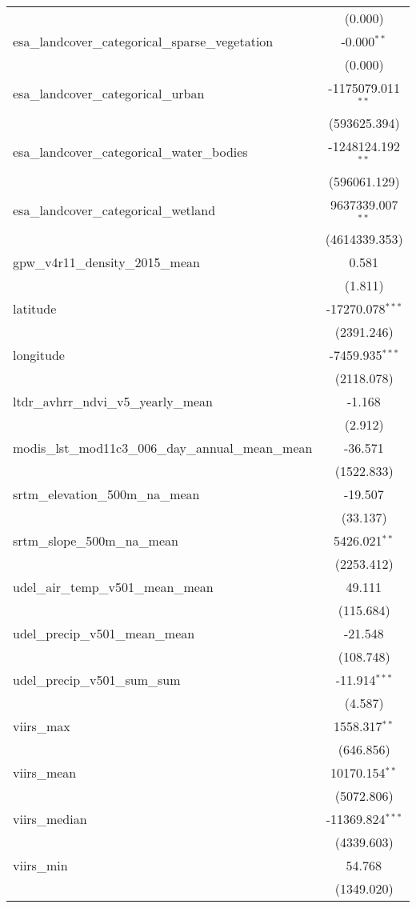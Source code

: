 \begin{table}[!htbp]
\begin{tabular}{@{\extracolsep{5pt}}lc}
  & (0.000) \\
 esa_landcover_categorical_sparse_vegetation & -0.000$^{**}$ \\
  & (0.000) \\
 esa_landcover_categorical_urban & -1175079.011$^{**}$ \\
  & (593625.394) \\
 esa_landcover_categorical_water_bodies & -1248124.192$^{**}$ \\
  & (596061.129) \\
 esa_landcover_categorical_wetland & 9637339.007$^{**}$ \\
  & (4614339.353) \\
 gpw_v4r11_density_2015_mean & 0.581$^{}$ \\
  & (1.811) \\
 latitude & -17270.078$^{***}$ \\
  & (2391.246) \\
 longitude & -7459.935$^{***}$ \\
  & (2118.078) \\
 ltdr_avhrr_ndvi_v5_yearly_mean & -1.168$^{}$ \\
  & (2.912) \\
 modis_lst_mod11c3_006_day_annual_mean_mean & -36.571$^{}$ \\
  & (1522.833) \\
 srtm_elevation_500m_na_mean & -19.507$^{}$ \\
  & (33.137) \\
 srtm_slope_500m_na_mean & 5426.021$^{**}$ \\
  & (2253.412) \\
 udel_air_temp_v501_mean_mean & 49.111$^{}$ \\
  & (115.684) \\
 udel_precip_v501_mean_mean & -21.548$^{}$ \\
  & (108.748) \\
 udel_precip_v501_sum_sum & -11.914$^{***}$ \\
  & (4.587) \\
 viirs_max & 1558.317$^{**}$ \\
  & (646.856) \\
 viirs_mean & 10170.154$^{**}$ \\
  & (5072.806) \\
 viirs_median & -11369.824$^{***}$ \\
  & (4339.603) \\
 viirs_min & 54.768$^{}$ \\
  & (1349.020) \\

\end{tabular}
\end{table}

